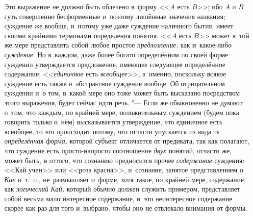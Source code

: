 Это выражение не должно быть облечено в~форму <<$A$ есть $B$>>; ибо $A$ и $B$
суть совершенно бесформенные и~поэтому лишённые значения названия; суждение же
вообще, и~потому уже даже суждение наличного бытия, имеет своими крайними
терминами определения понятия. <<$A$ есть $B$>> может в~той же мере
представлять собой любое простое {\em предложение,} как и~какое-либо
{\em суждение}. Но в~каждом, даже более богато определённом по своей форме
суждении утверждается предложение, имеющее следующее определённое содержание:
<<{\em единичное} есть {\em всеобщее}>>, а~именно, поскольку всякое суждение
есть также и~абстрактное суждение вообще. Об отрицательном суждении и~о том,
в~какой мере оно тоже может быть высказано посредством этого выражения, будет
сейчас идти речь. "--- Если же обыкновенно не думают о~том, что каждым, по
крайней мере, положительным суждением (будем пока говорить только о~нём)
высказывается утверждение, что единичное есть всеобщее, то это происходит
потому, что отчасти упускается из вида та {\em определённая форма,} которой
субъект отличается от предиката, так как полагают, что суждение есть
просто-напросто соотношение {\em двух} понятий, отчасти же, может быть, и
оттого, что сознанию предносится прочее {\em содержание} суждения: <<Кай учен>>
или <<роза красна>>, и~сознание, занятое представлением о {\em Кае} и~т.~п.,
не~размышляет о~форме, хотя такое, по крайней мере, содержание, как {\em
логический Кай,} который обычно должен служить примером, представляет собой
весьма мало интересное содержание, и~это неинтересное содержание скорее как раз
для того и~выбрано, чтобы оно не отвлекало внимания от формы.

